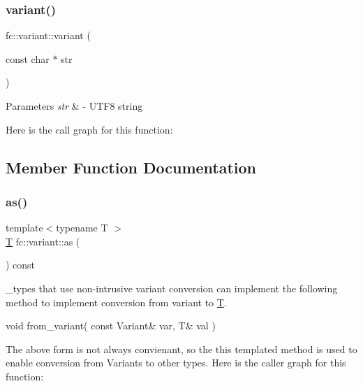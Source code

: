 \subsubsection{\texorpdfstring{variant()}{variant()}}
{\footnotesize\ttfamily fc\+::variant\+::variant (\begin{DoxyParamCaption}\item[{const char $\ast$}]{str }\end{DoxyParamCaption})}


\begin{DoxyParams}{Parameters}
{\em str} & -\/ U\+T\+F8 string \\
\hline
\end{DoxyParams}
Here is the call graph for this function\+:


\subsection{Member Function Documentation}
\mbox{\label{classfc_1_1variant_a82edd1f33199355d3a1f19bbb92909cc}} 
\subsubsection{\texorpdfstring{as()}{as()}}
{\footnotesize\ttfamily template$<$typename T $>$ \\
\mbox{\hyperlink{struct_t}{T}} fc\+::variant\+::as (\begin{DoxyParamCaption}{ }\end{DoxyParamCaption}) const\hspace{0.3cm}{\ttfamily [inline]}}

\+\_\+types that use non-\/intrusive variant conversion can implement the following method to implement conversion from variant to \mbox{\hyperlink{struct_t}{T}}.

{\ttfamily  void from\+\_\+variant( const Variant\& var, T\& val ) }

The above form is not always convienant, so the this templated method is used to enable conversion from Variants to other types. Here is the caller graph for this function\+:
\mbox{\label{classfc_1_1variant_acbd70a93184e4277631f2a261acb707c}} 
